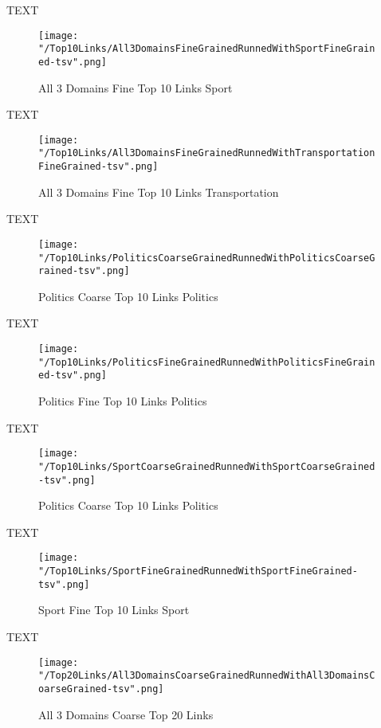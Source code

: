 \documentclass[thesis=M,english]{FITthesis}[2012/10/20]
\begin{document}
	TEXT	

	\begin{figure}\centering
		\texttt{[image: "/Top10Links/All3DomainsFineGrainedRunnedWithSportFineGrained-tsv".png]}
		\caption{All 3 Domains Fine Top 10 Links Sport}\label{}
	\end{figure}
	
		TEXT	

	\begin{figure}\centering
		\texttt{[image: "/Top10Links/All3DomainsFineGrainedRunnedWithTransportationFineGrained-tsv".png]}
		\caption{All 3 Domains Fine Top 10 Links Transportation}\label{}	
	\end{figure}
	
	TEXT

	\begin{figure}\centering
		\texttt{[image: "/Top10Links/PoliticsCoarseGrainedRunnedWithPoliticsCoarseGrained-tsv".png]}
		\caption{Politics Coarse Top 10 Links Politics}\label{}
	\end{figure}	

	TEXT	

	\begin{figure}\centering
		\texttt{[image: "/Top10Links/PoliticsFineGrainedRunnedWithPoliticsFineGrained-tsv".png]}
		\caption{Politics Fine Top 10 Links Politics}\label{}
	\end{figure}

	
	TEXT

	\begin{figure}\centering
		\texttt{[image: "/Top10Links/SportCoarseGrainedRunnedWithSportCoarseGrained-tsv".png]}
		\caption{Politics Coarse Top 10 Links Politics}\label{}
	\end{figure}		
	
		TEXT	

	\begin{figure}\centering
		\texttt{[image: "/Top10Links/SportFineGrainedRunnedWithSportFineGrained-tsv".png]}
		\caption{Sport Fine Top 10 Links Sport}\label{}	
	\end{figure}

	TEXT

	\begin{figure}\centering
		\texttt{[image: "/Top20Links/All3DomainsCoarseGrainedRunnedWithAll3DomainsCoarseGrained-tsv".png]}
		\caption{All 3 Domains Coarse Top 20 Links}\label{}
	\end{figure}
\end{document}
